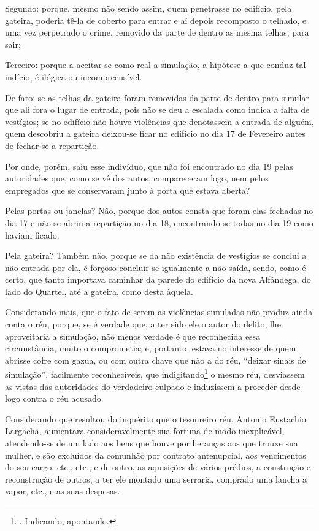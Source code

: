 Segundo: porque, mesmo não sendo assim, quem penetrasse no edifício,
pela gateira, poderia tê-la de coberto para entrar e aí depois
recomposto o telhado, e uma vez perpetrado o crime, removido da parte de
dentro as mesma telhas, para sair;

Terceiro: porque a aceitar-se como real a simulação, a hipótese a que
conduz tal indício, é ilógica ou incompreensível.

De fato: se as telhas da gateira foram removidas da parte de dentro para
simular que ali fora o lugar de entrada, pois não se deu a escalada como
indica a falta de vestígios; se no edifício não houve violências que
denotassem a entrada de alguém, quem descobriu a gateira deixou-se ficar
no edifício no dia 17 de Fevereiro antes de fechar-se a repartição.

Por onde, porém, saiu esse indivíduo, que não foi encontrado no dia 19
pelas autoridades que, como se vê dos autos, compareceram logo, nem
pelos empregados que se conservaram junto à porta que estava aberta?

Pelas portas ou janelas? Não, porque dos autos consta que foram elas
fechadas no dia 17 e não se abriu a repartição no dia 18, encontrando-se
todas no dia 19 como haviam ficado.

Pela gateira? Também não, porque se da não existência de vestígios se
conclui a não entrada por ela, é forçoso concluir-se igualmente a não
saída, sendo, como é certo, que tanto importava caminhar da parede do
edifício da nova Alfândega, do lado do Quartel, até a gateira, como
desta àquela.

Considerando mais, que o fato de serem as violências simuladas não
produz ainda conta o réu, porque, se é verdade que, a ter sido ele o
autor do delito, lhe aproveitaria a simulação, não menos verdade é que
reconhecida essa circunstância, muito o comprometia; e, portanto, estava
no interesse de quem abrisse cofre com gazua, ou com outra chave que não
a do réu, ``deixar sinais de simulação'', facilmente reconhecíveis, que
indigitando\footnote{. Indicando, apontando.} o mesmo réu, desviassem as
vistas das autoridades do verdadeiro culpado e induzissem a proceder
desde logo contra o réu acusado.

Considerando que resultou do inquérito que o tesoureiro réu, Antonio
Eustachio Largacha, aumentara consideravelmente sua fortuna de modo
inexplicável, atendendo-se de um lado aos bens que houve por heranças
aos que trouxe sua mulher, e são excluídos da comunhão por contrato
antenupcial, aos vencimentos do seu cargo, etc., etc.; e de outro, as
aquisições de vários prédios, a construção e reconstrução de outros, a
ter ele montado uma serraria, comprado uma lancha a vapor, etc., e as
suas despesas.

